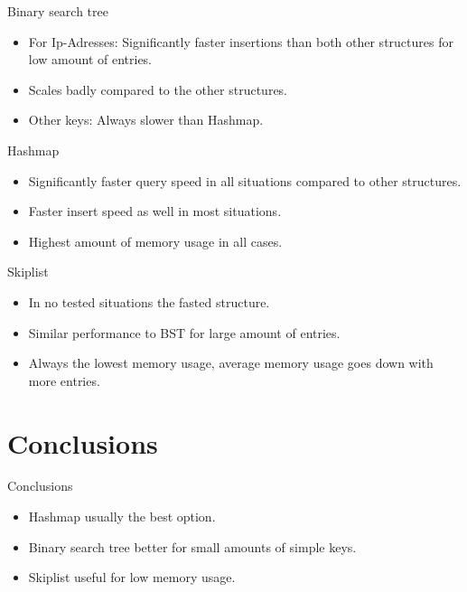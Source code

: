 \documentclass[10pt]{beamer}
\begin{document}
\begin{frame}{Binary search tree}
    \begin{itemize}
        \item For Ip-Adresses: Significantly faster insertions than both other structures for low amount of entries.
        \item Scales badly compared to the other structures.
        \item Other keys: Always slower than Hashmap.
    \end{itemize}       
\end{frame}

\begin{frame}{Hashmap}
    \begin{itemize}
        \item Significantly faster query speed in all situations compared to other structures.
        \item Faster insert speed as well in most situations.
        \item Highest amount of memory usage in all cases.
    \end{itemize}       
\end{frame}

\begin{frame}{Skiplist}
    \begin{itemize}
        \item In no tested situations the fasted structure.
        \item Similar performance to BST for large amount of entries.
        \item Always the lowest memory usage, average memory usage goes down with more entries.
    \end{itemize}       
\end{frame}

\section{Conclusions}

\begin{frame}{Conclusions}
    \begin{itemize}
        \item Hashmap usually the best option.
        \item Binary search tree better for small amounts of simple keys.
        \item Skiplist useful for low memory usage.
    \end{itemize}
\end{frame}
\end{document}
